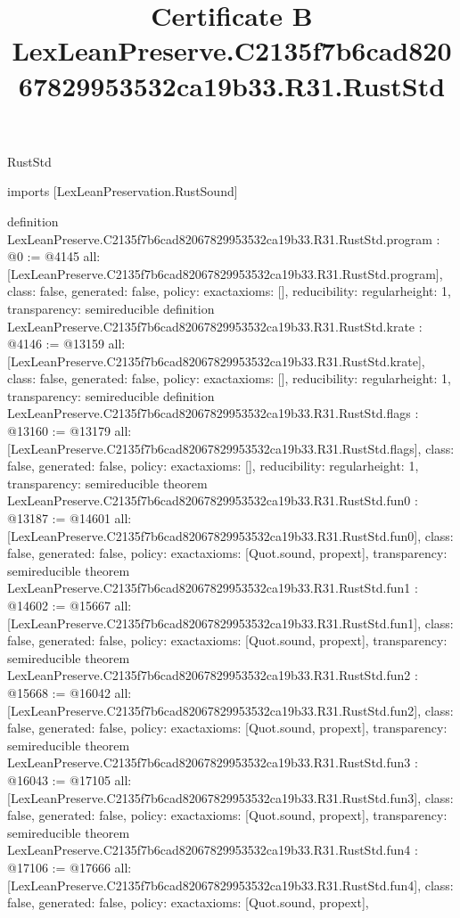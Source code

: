\begin{lexlean}{RustStd}
\title{Certificate B LexLeanPreserve.C2135f7b6cad82067829953532ca19b33.R31.RustStd}
\begin{coremodule}
imports [LexLeanPreservation.RustSound]

definition LexLeanPreserve.C2135f7b6cad82067829953532ca19b33.R31.RustStd.program : @0 := @4145 {
  all: [LexLeanPreserve.C2135f7b6cad82067829953532ca19b33.R31.RustStd.program],
  class: false,
  generated: false,
  policy: exact{axioms: []},
  reducibility: regular{height: 1},
  transparency: semireducible
}
definition LexLeanPreserve.C2135f7b6cad82067829953532ca19b33.R31.RustStd.krate : @4146 := @13159 {
  all: [LexLeanPreserve.C2135f7b6cad82067829953532ca19b33.R31.RustStd.krate],
  class: false,
  generated: false,
  policy: exact{axioms: []},
  reducibility: regular{height: 1},
  transparency: semireducible
}
definition LexLeanPreserve.C2135f7b6cad82067829953532ca19b33.R31.RustStd.flags : @13160 := @13179 {
  all: [LexLeanPreserve.C2135f7b6cad82067829953532ca19b33.R31.RustStd.flags],
  class: false,
  generated: false,
  policy: exact{axioms: []},
  reducibility: regular{height: 1},
  transparency: semireducible
}
theorem LexLeanPreserve.C2135f7b6cad82067829953532ca19b33.R31.RustStd.fun0 : @13187 := @14601 {
  all: [LexLeanPreserve.C2135f7b6cad82067829953532ca19b33.R31.RustStd.fun0],
  class: false,
  generated: false,
  policy: exact{axioms: [Quot.sound, propext]},
  transparency: semireducible
}
theorem LexLeanPreserve.C2135f7b6cad82067829953532ca19b33.R31.RustStd.fun1 : @14602 := @15667 {
  all: [LexLeanPreserve.C2135f7b6cad82067829953532ca19b33.R31.RustStd.fun1],
  class: false,
  generated: false,
  policy: exact{axioms: [Quot.sound, propext]},
  transparency: semireducible
}
theorem LexLeanPreserve.C2135f7b6cad82067829953532ca19b33.R31.RustStd.fun2 : @15668 := @16042 {
  all: [LexLeanPreserve.C2135f7b6cad82067829953532ca19b33.R31.RustStd.fun2],
  class: false,
  generated: false,
  policy: exact{axioms: [Quot.sound, propext]},
  transparency: semireducible
}
theorem LexLeanPreserve.C2135f7b6cad82067829953532ca19b33.R31.RustStd.fun3 : @16043 := @17105 {
  all: [LexLeanPreserve.C2135f7b6cad82067829953532ca19b33.R31.RustStd.fun3],
  class: false,
  generated: false,
  policy: exact{axioms: [Quot.sound, propext]},
  transparency: semireducible
}
theorem LexLeanPreserve.C2135f7b6cad82067829953532ca19b33.R31.RustStd.fun4 : @17106 := @17666 {
  all: [LexLeanPreserve.C2135f7b6cad82067829953532ca19b33.R31.RustStd.fun4],
  class: false,
  generated: false,
  policy: exact{axioms: [Quot.sound, propext]},
}
\end{coremodule}
\end{lexlean}
